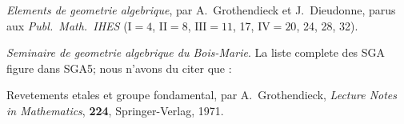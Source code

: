 \documentclass[12pt,a4paper]{article}
\theoremstyle{plain}
\theoremstyle{definition}
\theoremstyle{remark}
\begin{document}
\begin{description}[style=nextline]
\item[EGA] \textit{Elements de geometrie algebrique}, par A.\ Grothendieck et J.\ Dieudonne, parus aux \textit{Publ.\ Math.\ IHES} ($\mathrm{I}=4$, $\mathrm{II}=8$, $\mathrm{III}=11$, 17, $\mathrm{IV}=20$, 24, 28, 32).
\item[SGA] \textit{Seminaire de geometrie algebrique du Bois-Marie}. La liste complete des SGA figure dans SGA5; nous n'avons du citer que :
\item[SGA\textsubscript{1}] Revetements etales et groupe fondamental, par A.\ Grothendieck, \textit{Lecture Notes in Mathematics}, \textbf{224}, Springer-Verlag, 1971.
\end{description}
\end{document}
